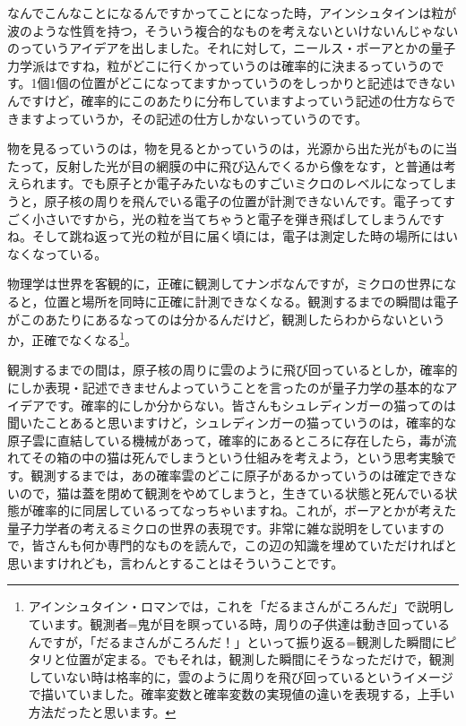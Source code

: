 \documentclass{ltjsbook}
\begin{document}
なんでこんなことになるんですかってことになった時，アインシュタインは粒が波のような性質を持つ，そういう複合的なものを考えないといけないんじゃないのっていうアイデアを出しました。それに対して，ニールス・ボーアとかの量子力学派はですね，粒がどこに行くかっていうのは確率的に決まるっていうのです。1個1個の位置がどこになってますかっていうのをしっかりと記述はできないんですけど，確率的にこのあたりに分布していますよっていう記述の仕方ならできますよっていうか，その記述の仕方しかないっていうのです。

物を見るっていうのは，物を見るとかっていうのは，光源から出た光がものに当たって，反射した光が目の網膜の中に飛び込んでくるから像をなす，と普通は考えられます。でも原子とか電子みたいなものすごいミクロのレベルになってしまうと，原子核の周りを飛んでいる電子の位置が計測できないんです。電子ってすごく小さいですから，光の粒を当てちゃうと電子を弾き飛ばしてしまうんですね。そして跳ね返って光の粒が目に届く頃には，電子は測定した時の場所にはいなくなっている。

物理学は世界を客観的に，正確に観測してナンボなんですが，ミクロの世界になると，位置と場所を同時に正確に計測できなくなる。観測するまでの瞬間は電子がこのあたりにあるなってのは分かるんだけど，観測したらわからないというか，正確でなくなる\footnote{アインシュタイン・ロマンでは，これを「だるまさんがころんだ」で説明しています。観測者=鬼が目を瞑っている時，周りの子供達は動き回っているんですが，「だるまさんがころんだ！」といって振り返る=観測した瞬間にピタリと位置が定まる。でもそれは，観測した瞬間にそうなっただけで，観測していない時は格率的に，雲のように周りを飛び回っているというイメージで描いていました。確率変数と確率変数の実現値の違いを表現する，上手い方法だったと思います。}。

観測するまでの間は，原子核の周りに雲のように飛び回っているとしか，確率的にしか表現・記述できませんよっていうことを言ったのが量子力学の基本的なアイデアです。確率的にしか分からない。皆さんもシュレディンガーの猫ってのは聞いたことあると思いますけど，シュレディンガーの猫っていうのは，確率的な原子雲に直結している機械があって，確率的にあるところに存在したら，毒が流れてその箱の中の猫は死んでしまうという仕組みを考えよう，という思考実験です。観測するまでは，あの確率雲のどこに原子があるかっていうのは確定できないので，猫は蓋を閉めて観測をやめてしまうと，生きている状態と死んでいる状態が確率的に同居しているってなっちゃいますね。これが，ボーアとかが考えた量子力学者の考えるミクロの世界の表現です。非常に雑な説明をしていますので，皆さんも何か専門的なものを読んで，この辺の知識を埋めていただければと思いますけれども，言わんとすることはそういうことです。
\end{document}
